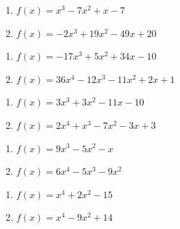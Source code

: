 \begin{multicols}{2}
\begin{enumerate}
\setcounter{enumi}{\value{HW}}

\item $f(x) = x^{3} - 7x^{2} + x - 7$
\item $f(x) = -2x^{3} + 19x^{2} - 49x + 20$

\setcounter{HW}{\value{enumi}}
\end{enumerate}
\end{multicols}

\begin{multicols}{2}
\begin{enumerate}
\setcounter{enumi}{\value{HW}}

\item $f(x) = -17x^{3} + 5x^{2} + 34x - 10$
\item $f(x) = 36x^{4} - 12x^{3} - 11x^{2} + 2x + 1$

\setcounter{HW}{\value{enumi}}
\end{enumerate}
\end{multicols}

\begin{multicols}{2}
\begin{enumerate}
\setcounter{enumi}{\value{HW}}

\item $f(x) = 3x^{3} + 3x^{2} - 11x - 10$
\item $f(x) = 2x^4+x^3-7x^2-3x+3$

\setcounter{HW}{\value{enumi}}
\end{enumerate}
\end{multicols}

\begin{multicols}{2}
\begin{enumerate}
\setcounter{enumi}{\value{HW}}

\item $f(x) = 9x^{3} - 5x^{2} - x$
\item $f(x) = 6x^{4} - 5x^{3} - 9x^{2}$

\setcounter{HW}{\value{enumi}}
\end{enumerate}
\end{multicols}

\begin{multicols}{2}
\begin{enumerate}
\setcounter{enumi}{\value{HW}}

\item $f(x) = x^4+2x^2 - 15$
\item $f(x) = x^4-9x^2+14$

\setcounter{HW}{\value{enumi}}
\end{enumerate}
\end{multicols}

